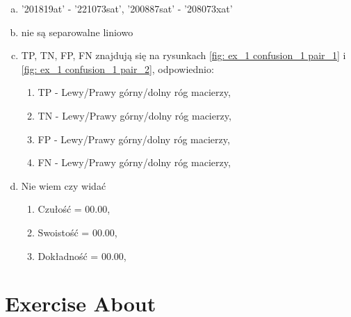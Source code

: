     \begin{enumerate}[a)]
        \item '201819\textunderscore at' - '221073\textunderscore s\textunderscore at', '200887\textunderscore s\textunderscore at' - '208073\textunderscore x\textunderscore at'
        \item nie są separowalne liniowo
        \item TP, TN, FP, FN znajdują się na rysunkach \ref{fig: ex_1 confusion_1 pair_1} i \ref{fig: ex_1 confusion_1 pair_2}, odpowiednio:
            \begin{enumerate}[1.]
                \item TP - Lewy/Prawy górny/dolny róg macierzy,
                \item TN - Lewy/Prawy górny/dolny róg macierzy,
                \item FP - Lewy/Prawy górny/dolny róg macierzy,
                \item FN - Lewy/Prawy górny/dolny róg macierzy,
            \end{enumerate}
        \item Nie wiem czy widać
            \begin{enumerate}[1.]
                \item Czułość = $00.00$,
                \item Swoistość = $00.00$,
                \item Dokładność = $00.00$,
            \end{enumerate}
    \end{enumerate}

\section[\texorpdfstring{Exercise About BibTeX}{Exercise About \BibTeX{}}]{Exercise About \BibTeX{}}

\setlength\itemsep{-0.5em} %
\itemsep{-0.5em} %

